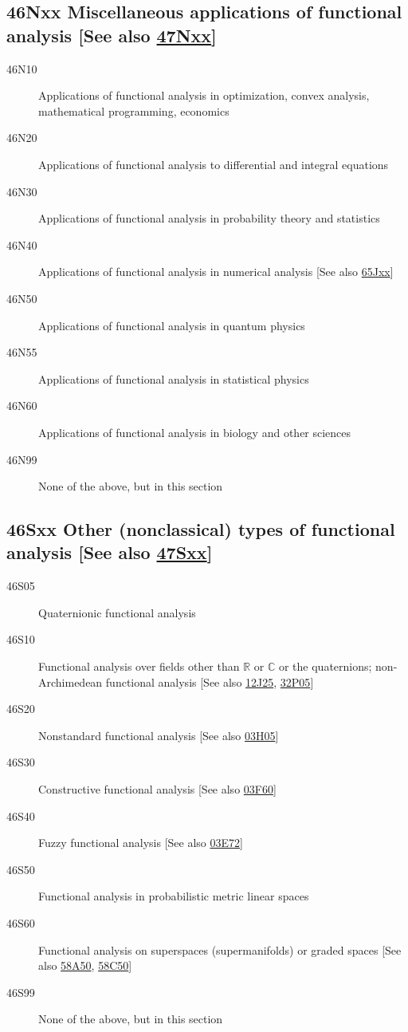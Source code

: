 \documentclass[letterpaper]{article}
\begin{document}
\subsection*{46Nxx  Miscellaneous applications of functional analysis [See also \hyperref[47Nxx]{47Nxx}] }\label{46Nxx}
\begin{description}  
\item [46N10]\label{46N10} Applications of functional analysis in optimization, convex analysis, mathematical programming, economics
\item [46N20]\label{46N20} Applications of functional analysis to differential and integral equations
\item [46N30]\label{46N30} Applications of functional analysis in probability theory and statistics
\item [46N40]\label{46N40} Applications of functional analysis in numerical analysis [See also \hyperref[65Jxx]{65Jxx}]
\item [46N50]\label{46N50} Applications of functional analysis in quantum physics
\item [46N55]\label{46N55} Applications of functional analysis in statistical physics
\item [46N60]\label{46N60} Applications of functional analysis in biology and other sciences
\item [46N99]\label{46N99} None of the above, but in this section
\end{description}
\subsection*{46Sxx  Other (nonclassical) types of functional analysis [See also \hyperref[47Sxx]{47Sxx}] }\label{46Sxx}
\begin{description}  
\item [46S05]\label{46S05} Quaternionic functional analysis
\item [46S10]\label{46S10} Functional analysis over fields other than $\mathbb{R}$ or $\mathbb{C}$ or the quaternions; non-Archimedean functional analysis [See also \hyperref[12J25]{12J25}, \hyperref[32P05]{32P05}]
\item [46S20]\label{46S20} Nonstandard functional analysis [See also \hyperref[03H05]{03H05}]
\item [46S30]\label{46S30} Constructive functional analysis [See also \hyperref[03F60]{03F60}]
\item [46S40]\label{46S40} Fuzzy functional analysis [See also \hyperref[03E72]{03E72}]
\item [46S50]\label{46S50} Functional analysis in probabilistic metric linear spaces
\item [46S60]\label{46S60} Functional analysis on superspaces (supermanifolds) or graded spaces [See also \hyperref[58A50]{58A50}, \hyperref[58C50]{58C50}]
\item [46S99]\label{46S99} None of the above, but in this section
\end{description}
\end{document}
